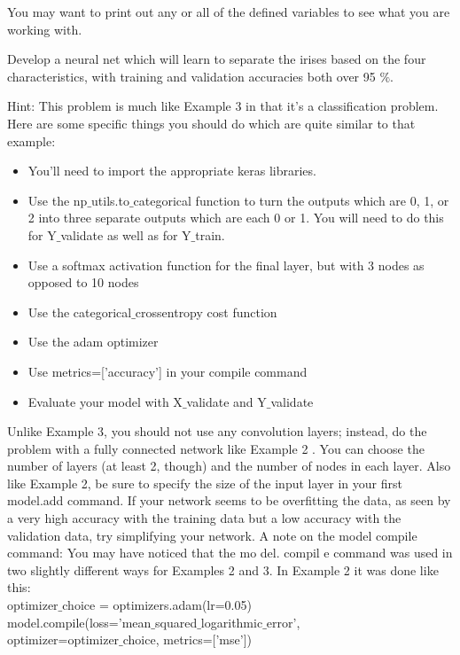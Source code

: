 You may want to print out any or all of the defined variables to see what you are
working with.

\begin{problem}\label{P13.5} Develop a neural net which will learn to separate the irises based on the
four characteristics, with training and validation accuracies both over 95 $\%$.\end{problem}
Hint: This problem is much like Example 3 in that it's a classification problem. Here are some specific things you should do which are quite similar to that example:
\begin{itemize}
\item You\rq ll need to import the appropriate keras libraries.
\item Use the np$\_$utils.to$\_$categorical function to turn the outputs which
are 0, 1, or 2 into three separate outputs which are each 0 or 1. You will need
to do this for Y$\_$validate as well as for Y$\_$train.
\item Use a softmax activation function for the final layer, but with 3 nodes as
opposed to 10 nodes
\item Use the categorical$\_$crossentropy cost function
\item Use the adam optimizer
\item Use metrics=['accuracy'] in your compile command
\item  Evaluate your model with X$\_$validate and Y$\_$validate
\end{itemize}
Unlike Example 3, you should not use any convolution layers; instead, do the problem with a fully connected network like Example 2 . You can choose the number of layers (at least 2, though) and the number of nodes in each layer. Also like Example 2, be sure to specify the size of the input layer in your first model.add command. If your network seems to be overfitting the data, as seen by a very high accuracy with the training data but a low accuracy with the validation data, try simplifying your network.
A note on the model compile command: You may have noticed that the mo del. compil e command was used in two slightly different ways for Examples 2 and 3. In Example 2 it was done like this:\\
optimizer$\_$choice = optimizers.adam(lr=0.05)\\
model.compile(loss='mean$\_$squared$\_$logarithmic$\_$error',\\
optimizer=optimizer$\_$choice, metrics=['mse'])\\

